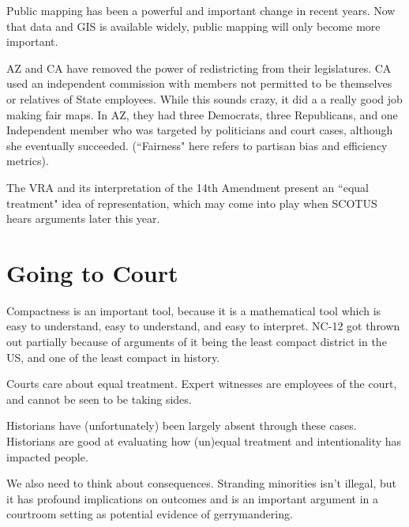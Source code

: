 Public mapping has been a powerful and important change in recent years.  Now that data and GIS is available widely, public mapping will only become more important.

AZ and CA have removed the power of redistricting from their legislatures.  CA used an independent commission with members not permitted to be themselves or relatives of State employees.  While this sounds crazy, it did a a really good job making fair maps.  In AZ, they had three Democrats, three Republicans, and one Independent member who was targeted by politicians and court cases, although she eventually succeeded. (``Fairness" here refers to partisan bias and efficiency metrics).

The VRA and its interpretation of the 14th Amendment present an ``equal treatment" idea of representation, which may come into play when SCOTUS hears arguments later this year.

\section*{Going to Court}

Compactness is an important tool, because it is a mathematical tool which is easy to understand, easy to understand, and easy to interpret.  NC-12 got thrown out partially because of arguments of it being the least compact district in the US, and one of the least compact in history.

Courts care about equal treatment.  Expert witnesses are employees of the court, and cannot be seen to be taking sides. 

Historians have (unfortunately) been largely absent through these cases.  Historians are good at evaluating how (un)equal treatment and intentionality has impacted people.

We also need to think about consequences.  Stranding minorities isn't illegal, but it has profound implications on outcomes and is an important argument in a courtroom setting as potential evidence of gerrymandering.


















